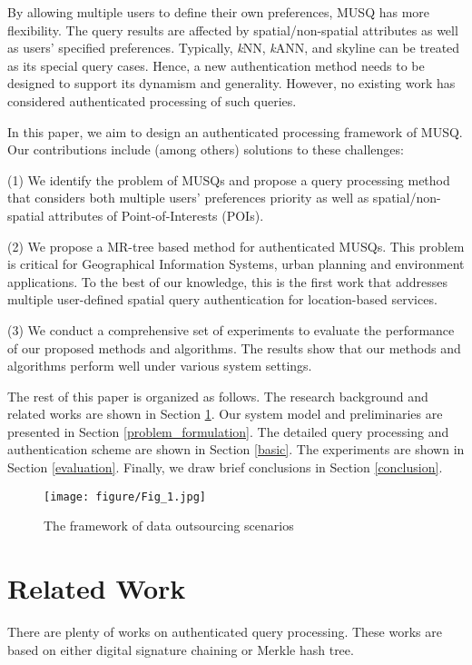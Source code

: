 \documentclass[10pt, conference, compsocconf]{IEEEtran}
\begin{document}
By allowing multiple users to define their own preferences, MUSQ has more flexibility. The query results are affected by spatial/non-spatial attributes as well as users' specified preferences. Typically, \emph{k}NN, \emph{k}ANN, and skyline can be treated as its special query cases. Hence, a new authentication method needs to be designed to support its dynamism and generality. However, no existing work has considered authenticated processing of such queries.

In this paper, we aim to design an authenticated processing framework of MUSQ. Our contributions include (among others) solutions to these challenges:

(1) We identify the problem of MUSQs and propose a query processing method that considers both multiple users' preferences priority as well as spatial/non-spatial attributes of Point-of-Interests (POIs).

(2) We propose a MR-tree based method for authenticated MUSQs.
This problem is critical for Geographical Information Systems, urban planning and environment applications. To the best of our knowledge, this is the first work that addresses multiple user-defined spatial query authentication for location-based services.

(3) We conduct a comprehensive set of experiments to evaluate the performance of our proposed methods and algorithms. The results show that our methods and algorithms perform well under various system settings.

The rest of this paper is organized as follows. The research background and related works are shown in Section \ref{related_work}. Our system model and preliminaries are presented in Section \ref{problem_formulation}. The detailed query processing and authentication scheme are shown in Section \ref{basic}. The experiments are shown in Section \ref{evaluation}. Finally, we draw brief conclusions in Section \ref{conclusion}.

\begin{figure}[htbp]
	\centering
	\texttt{[image: figure/Fig\_1.jpg]}
	\caption{The framework of data outsourcing scenarios}\label{framework}
\end{figure}


\section{Related Work}\label{related_work}

There are plenty of works on authenticated query processing. These works are based on either digital signature chaining or Merkle hash tree.
\end{document}
